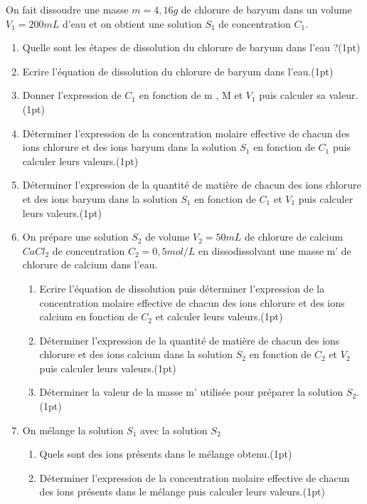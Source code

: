 \documentclass[12pt]{article}
\begin{document}
On fait dissoudre une masse $m=4,16g$ de chlorure de baryum dans un volume $V_1=200mL$ d’eau et on obtient une solution $S_1$ de concentration $C_1$.
\begin{enumerate}
    \item Quelle sont les étapes de dissolution du chlorure de baryum dans l’eau ?\dotfill(1pt)
    \item Ecrire l’équation de dissolution du chlorure de baryum dans l’eau.\dotfill(1pt)
    \item Donner l’expression de $C_1$ en fonction de m , M et $V_1$ puis calculer sa valeur. \dotfill(1pt)
        \item Déterminer l’expression de la concentration molaire effective de chacun des ions chlorure et des ions baryum dans la solution $S_1$ en fonction de $C_1$ puis calculer leurs valeurs.\dotfill(1pt)
            \item Déterminer l’expression de la quantité de matière de chacun des ions chlorure et des ions baryum dans la solution $S_1$ en fonction de $C_1$ et $V_1$ puis calculer leurs valeurs.\dotfill(1pt)
                \item On prépare une solution $S_2$ de volume $V_2=50mL$ de chlorure de calcium $CaCl_2$ de concentration $C_2=0,5mol/L$ en dissodissolvant une masse m’ de chlorure de calcium dans l’eau.
\begin{enumerate}
    \item Ecrire l’équation de dissolution puis déterminer l’expression de la concentration molaire effective de chacun des ions chlorure et des ions calcium en fonction de $C_2$ et calculer leurs valeurs.\dotfill(1pt)
    \item Déterminer l’expression de la quantité de matière de chacun des ions chlorure et des ions calcium dans la solution $S_2$ en fonction de $C_2$ et $V_2$ puis calculer leurs valeurs.\dotfill(1pt)
    \item Déterminer la valeur de la masse m’ utilisée pour préparer la solution $S_2$.\dotfill(1pt)
\end{enumerate}
\item On mélange la solution $S_1$ avec la solution $S_2$
    \begin{enumerate}
        \item Quels sont des ions présents dans le mélange obtenu.\dotfill(1pt)
        \item Déterminer l’expression de la concentration molaire effective de chacun des ions présents dans le mélange puis calculer leurs valeurs.\dotfill(1pt)
    \end{enumerate}
\end{enumerate}
\end{document}
